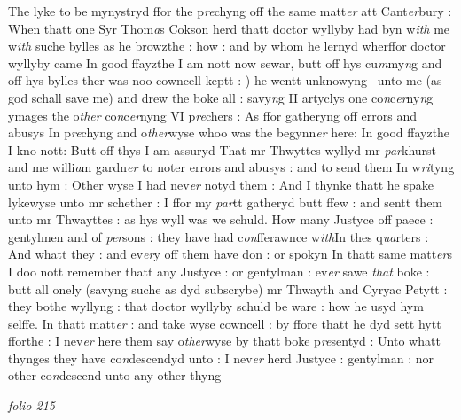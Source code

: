 \documentclass[12pt, a4paper]{book}
\begin{document}
The lyke to be mynystryd ffor the p\textit{re}chyng  off the same matt\textit{er} att Cant\textit{er}bury : When thatt one Syr Thom\textit{a}s Cokson herd thatt doctor wyllyby
			 had byn w\textit{ith} me w\textit{ith} suche bylles as he browzthe : how : and by whom he lernyd wherffor doctor wyllyby came  In good ffayzthe I am nott now sewar, butt off hys cu\textit{m}my\textit{n}g and off hys bylles ther was noo cowncell keptt : ) he wentt unknowyng  unto me (as god schall save me) and drew the boke all : savy\textit{n}g II artyclys one co\textit{n}c\textit{er}ny\textit{n}g ymages the o\textit{ther} co\textit{n}c\textit{er}nyng VI p\textit{re}chers : As ffor gatheryng off errors and abusys In p\textit{re}chyng and o\textit{ther}wyse whoo was the begynn\textit{er} here: In good ffayzthe I kno nott: Butt off thys I am assuryd 
				\marginpar[\vspace{0.5cm}{\textcolor{Gray}{Mr Twaith}}]{}
			 That mr Thwyttes wyllyd mr \textit{par}khurst and me willi\textit{a}m gardn\textit{er} to  noter errors and abusys : and to send them In w\textit{ri}tyng unto hym : Other wyse I had nev\textit{er} notyd them : And I thynke thatt he spake lykewyse unto mr schether : I ffor my \textit{par}tt gatheryd butt ffew : and sentt them unto mr Thwayttes : as hys wyll was we schuld. How many Justyce off paece : gentylmen and of \textit{per}sons : they have had c\textit{on}fferawnce w\textit{ith}In thes q\textit{ua}rters : And whatt they : and ev\textit{er}y off them have don : or spokyn In thatt same matt\textit{er}s I doo nott remember thatt any Justyce : or gentylman : ev\textit{er }sawe \textit{that}  boke : butt all onely (savyng suche as dyd subscrybe) mr Thwayth and Cyryac Petytt : they bothe wyllyng : that doctor wyllyby schuld be ware : how he usyd hym selffe. In thatt matt\textit{er} : and take wyse cowncell : by ffore thatt he dyd sett hytt fforthe : I nev\textit{er} here them say o\textit{ther}wyse by thatt boke p\textit{re}sentyd : Unto whatt thynges they have co\textit{n}descendyd unto : I nev\textit{er} herd Justyce : gentylman : nor other co\textit{n}descend unto any other thyng  

\dotfill
					

\textit{folio 215}
\end{document}

